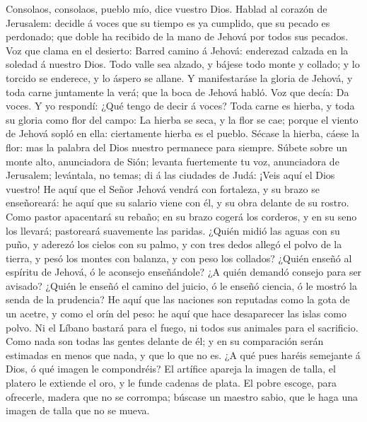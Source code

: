  Consolaos, consolaos, pueblo mío, dice vuestro Dios.
 Hablad al corazón de Jerusalem: decidle á voces que su
tiempo es ya cumplido, que su pecado es perdonado; que doble ha recibido
de la mano de Jehová por todos sus pecados.  Voz que clama
en el desierto: Barred camino á Jehová: enderezad calzada en la soledad
á nuestro Dios.  Todo valle sea alzado, y bájese todo monte
y collado; y lo torcido se enderece, y lo áspero se allane. 
Y manifestaráse la gloria de Jehová, y toda carne juntamente la verá;
que la boca de Jehová habló.  Voz que decía: Da voces. Y yo
respondí: ¿Qué tengo de decir á voces? Toda carne es hierba, y toda su
gloria como flor del campo:  La hierba se seca, y la flor se
cae; porque el viento de Jehová sopló en ella: ciertamente hierba es el
pueblo.  Sécase la hierba, cáese la flor: mas la palabra del
Dios nuestro permanece para siempre.  Súbete sobre un monte
alto, anunciadora de Sión; levanta fuertemente tu voz, anunciadora de
Jerusalem; levántala, no temas; di á las ciudades de Judá: ¡Veis aquí el
Dios vuestro!  He aquí que el Señor Jehová vendrá con
fortaleza, y su brazo se enseñoreará: he aquí que su salario viene con
él, y su obra delante de su rostro.  Como pastor apacentará
su rebaño; en su brazo cogerá los corderos, y en su seno los llevará;
pastoreará suavemente las paridas.  ¿Quién midió las aguas
con su puño, y aderezó los cielos con su palmo, y con tres dedos allegó
el polvo de la tierra, y pesó los montes con balanza, y con peso los
collados?  ¿Quién enseñó al espíritu de Jehová, ó le
aconsejo enseñándole?  ¿A quién demandó consejo para ser
avisado? ¿Quién le enseñó el camino del juicio, ó le enseñó ciencia, ó
le mostró la senda de la prudencia?  He aquí que las
naciones son reputadas como la gota de un acetre, y como el orín del
peso: he aquí que hace desaparecer las islas como polvo. 
Ni el Líbano bastará para el fuego, ni todos sus animales para el
sacrificio.  Como nada son todas las gentes delante de él;
y en su comparación serán estimadas en menos que nada, y que lo que no
es.  ¿A qué pues haréis semejante á Dios, ó qué imagen le
compondréis?  El artífice apareja la imagen de talla, el
platero le extiende el oro, y le funde cadenas de plata. 
El pobre escoge, para ofrecerle, madera que no se corrompa; búscase un
maestro sabio, que le haga una imagen de talla que no se mueva.
